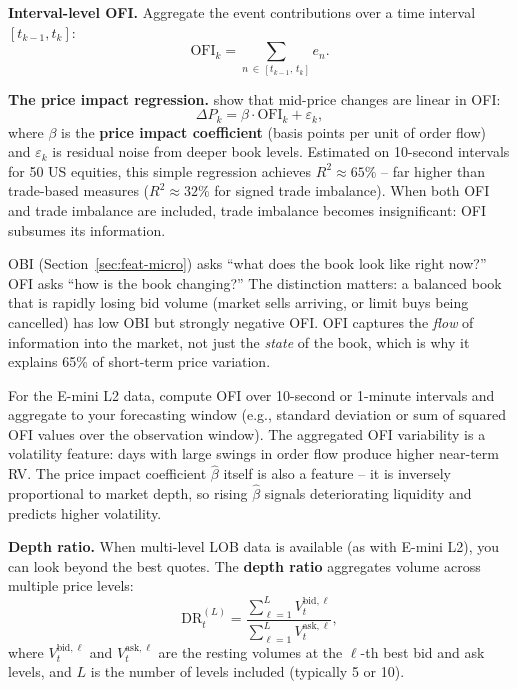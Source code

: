 \textbf{Interval-level OFI.}
Aggregate the event contributions over a time interval $[t_{k-1}, t_k]$:
\begin{equation}\label{eq:ofi}
\text{OFI}_k = \sum_{n \,\in\, [t_{k-1},\, t_k]} e_n.
\end{equation}

\textbf{The price impact regression.}
\citet{ContKukanovStoikov2014} show that mid-price changes are linear in OFI:
\begin{equation}\label{eq:ofi-regression}
\Delta P_k = \beta \cdot \text{OFI}_k + \varepsilon_k,
\end{equation}
where $\beta$ is the \textbf{price impact coefficient} (basis points per unit of order flow) and $\varepsilon_k$ is residual noise from deeper book levels.
Estimated on 10-second intervals for 50 US equities, this simple regression achieves $R^2 \approx 65\%$ -- far higher than trade-based measures ($R^2 \approx 32\%$ for signed trade imbalance).
When both OFI and trade imbalance are included, trade imbalance becomes insignificant: OFI subsumes its information.

\begin{intuition}
OBI (Section~\ref{sec:feat-micro}) asks ``what does the book look like right now?''
OFI asks ``how is the book changing?''
The distinction matters: a balanced book that is rapidly losing bid volume (market sells arriving, or limit buys being cancelled) has low OBI but strongly negative OFI.
OFI captures the \emph{flow} of information into the market, not just the \emph{state} of the book, which is why it explains 65\% of short-term price variation.
\end{intuition}

\begin{projectconnection}
For the E-mini L2 data, compute OFI over 10-second or 1-minute intervals and aggregate to your forecasting window (e.g., standard deviation or sum of squared OFI values over the observation window).
The aggregated OFI variability is a volatility feature: days with large swings in order flow produce higher near-term RV.
The price impact coefficient $\hat{\beta}$ itself is also a feature -- it is inversely proportional to market depth, so rising $\hat{\beta}$ signals deteriorating liquidity and predicts higher volatility.
\end{projectconnection}

\textbf{Depth ratio.}
When multi-level LOB data is available (as with E-mini L2), you can look beyond the best quotes.
The \textbf{depth ratio} aggregates volume across multiple price levels:
\begin{equation}\label{eq:depth-ratio}
\text{DR}_t^{(L)} = \frac{\sum_{\ell=1}^{L} V_t^{\text{bid},\ell}}{\sum_{\ell=1}^{L} V_t^{\text{ask},\ell}},
\end{equation}
where $V_t^{\text{bid},\ell}$ and $V_t^{\text{ask},\ell}$ are the resting volumes at the $\ell$-th best bid and ask levels, and $L$ is the number of levels included (typically 5 or 10).

